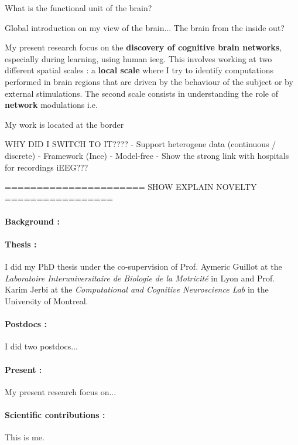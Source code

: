 \documentclass[a4paper,11pt]{article}
\begin{document}
\begin{multicols}{2}







What is the functional unit of the brain?

Global introduction on my view of the brain... The brain from the inside out?

My present research focus on the \textbf{discovery of cognitive brain networks}, especially during learning, using human \ac{ieeg}. This involves working at two different spatial scales : a \textbf{local scale} where I try to identify computations performed in brain regions that are driven by the behaviour of the subject or by external stimulations. The second scale consists in understanding the role of \textbf{network} modulations i.e. 

My work is located at the border 



WHY DID I SWITCH TO IT????
- Support heterogene data (continuous / discrete)
- Framework (Ince)
- Model-free
- Show the strong link with hospitals for recordings iEEG???

====================== SHOW EXPLAIN NOVELTY =================



\paragraph{Background :}

\paragraph{Thesis :} I did my PhD thesis under the co-supervision of Prof. Aymeric Guillot at the \textit{Laboratoire Interuniversitaire de Biologie de la Motricité} in Lyon and Prof. Karim Jerbi at the \textit{Computational and Cognitive Neuroscience Lab} in the University of Montreal.

\paragraph{Postdocs :} I did two postdocs...

\paragraph{Present :} My present research focus on...

\paragraph{Scientific contributions :}

This is me.

\end{multicols}
\end{document}
